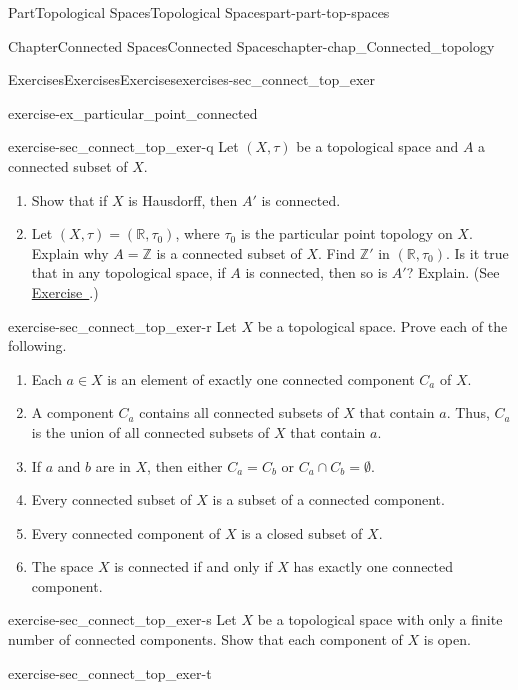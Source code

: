 \documentclass[oneside,10pt,]{book}
\newcommand{\xreffont}{\relax}
\numberwithin{equation}{chapter}
\newcommand{\Z}{\mathbb{Z}}
\newcommand{\R}{\mathbb{R}}
\begin{document}
\begin{partptx}{Part}{Topological Spaces}{}{Topological Spaces}{}{}{part-part-top-spaces}
\begin{chapterptx}{Chapter}{Connected Spaces}{}{Connected Spaces}{}{}{chapter-chap_Connected_topology}
\begin{exercises-section}{Exercises}{Exercises}{}{Exercises}{}{}{exercises-sec_connect_top_exer}
\begin{divisionexercise}{16}{}{}{exercise-ex_particular_point_connected}
\end{divisionexercise}%
\begin{divisionexercise}{17}{}{}{exercise-sec_connect_top_exer-q}%
Let \((X, \tau)\) be a topological space and \(A\) a connected subset of \(X\).%
\begin{enumerate}[font=\bfseries,label=(\alph*),ref=\alph*]%
\item{}Show that if \(X\) is Hausdorff, then \(A'\) is connected.%
\item{}Let \((X, \tau) = (\R, \tau_0)\), where \(\tau_0\) is the particular point topology on \(X\). Explain why \(A = \Z\) is a connected subset of \(X\). Find \(\Z'\) in \((\R, \tau_0)\). Is it true that in any topological space, if \(A\) is connected, then so is \(A'\)? Explain. (See \hyperlink{exercise-ex_particular_point_connected}{Exercise~{\xreffont 16}}.)%
\end{enumerate}%
\end{divisionexercise}%
\begin{divisionexercise}{18}{}{}{exercise-sec_connect_top_exer-r}%
Let \(X\) be a topological space. Prove each of the following.%
\begin{enumerate}[font=\bfseries,label=(\alph*),ref=\alph*]%
\item{}Each \(a \in X\) is an element of exactly one connected component \(C_a\) of \(X\).%
\item{}A component \(C_a\) contains all connected subsets of \(X\) that contain \(a\). Thus, \(C_a\) is the union of all connected subsets of \(X\) that contain \(a\).%
\item{}If \(a\) and \(b\) are in \(X\), then either \(C_a = C_b\) or \(C_a \cap C_b = \emptyset\).%
\item{}Every connected subset of \(X\) is a subset of a connected component.%
\item{}Every connected component of \(X\) is a closed subset of \(X\).%
\item{}The space \(X\) is connected if and only if \(X\) has exactly one connected component.%
\end{enumerate}%
\end{divisionexercise}%
\begin{divisionexercise}{19}{}{}{exercise-sec_connect_top_exer-s}%
Let \(X\) be a topological space with only a finite number of connected components. Show that each component of \(X\) is open.%
\end{divisionexercise}%
\begin{divisionexercise}{20}{}{}{exercise-sec_connect_top_exer-t}%

\end{divisionexercise}
\end{exercises-section}
\end{chapterptx}
\end{partptx}
\end{document}
